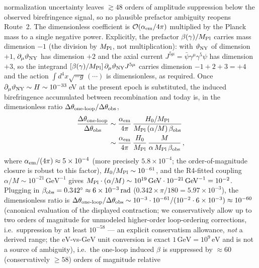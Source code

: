 \documentclass[aps,prd,twocolumn,superscriptaddress,showpacs,preprintnumbers,nofootinbib,longbibliography,floatfix]{revtex4-2}
\begin{document}
normalization uncertainty leaves $\gtrsim\!48$ orders of amplitude suppression
below the observed birefringence signal, so no plausible prefactor ambiguity
reopens Route~2. The dimensionless coefficient is $\mathcal{O}(\alpha_{\rm em}/4\pi)$
multiplied by the Planck mass to a single negative power. Explicitly, the
prefactor $\beta(\gamma)/M_{\rm Pl}$ carries mass dimension $-1$ (the
division by $M_{\rm Pl}$, not multiplication): with $\vartheta_{\rm NY}$ of
dimension $+1$, $\partial_\mu\vartheta_{\rm NY}$ has dimension $+2$ and the
axial current $J^{5\mu}=\bar\psi\gamma^\mu\gamma^5\psi$ has dimension $+3$,
so the integrand $[\beta(\gamma)/M_{\rm Pl}]\,\partial_\mu\vartheta_{\rm NY}J^{5\mu}$
carries dimension $-1+2+3=+4$ and the action $\int d^4x\sqrt{-g}\,(\cdots)$
is dimensionless, as required. Once
$\partial_\mu\vartheta_{\rm NY} \sim H \sim 10^{-33}\,$eV at the present epoch is
substituted, the induced birefringence accumulated between
recombination and today is, in the dimensionless ratio
$\Delta\theta_{\rm one\text{-}loop}/\Delta\theta_{\rm obs}$,
\begin{align}
\frac{\Delta\theta_{\rm one\text{-}loop}}{\Delta\theta_{\rm obs}}
&\sim \frac{\alpha_{\rm em}}{4\pi}\,\frac{H_0/M_{\rm Pl}}{M_{\rm Pl}\,(\alpha/M)\,\beta_{\rm obs}}\nonumber\\
&\sim \frac{\alpha_{\rm em}}{4\pi}\,\frac{H_0}{M_{\rm Pl}}\,\frac{M}{\alpha\,M_{\rm Pl}\,\beta_{\rm obs}}\,,
\end{align}
where $\alpha_{\rm em}/(4\pi) \approx 5 \times 10^{-4}$ (more precisely $5.8\times 10^{-4}$; the order-of-magnitude closure is robust to this factor), $H_0/M_{\rm Pl} \sim
10^{-61}$, and the R4-fitted coupling $\alpha/M \sim 10^{-21}\,\text{GeV}^{-1}$
gives $M_{\rm Pl}\cdot(\alpha/M) \sim 10^{19}\,\text{GeV} \cdot
10^{-21}\,\text{GeV}^{-1} = 10^{-2}$. Plugging in $\beta_{\rm obs}
= 0.342^\circ \approx 6\times 10^{-3}\,\text{rad}$
($0.342\times\pi/180 = 5.97\times 10^{-3}$), the dimensionless ratio is
$\Delta\theta_{\rm one\text{-}loop}/\Delta\theta_{\rm obs} \sim
10^{-3} \cdot 10^{-61}/(10^{-2}\cdot 6\times 10^{-3})\approx 10^{-60}$
(canonical evaluation of the displayed contraction; we conservatively
allow up to two orders of magnitude for unmodeled higher-order
loop-ordering corrections, i.e.\ suppression by at least $10^{-58}$ ---
an explicit conservatism allowance, \emph{not} a derived range; the
$\mathrm{eV}$-vs-$\mathrm{GeV}$ unit conversion is exact
$1\,\mathrm{GeV} = 10^9\,\mathrm{eV}$ and is not a source of
ambiguity), i.e.\ the one-loop induced $\beta$ is suppressed by
${\approx}60$ (conservatively $\geq 58$) orders of magnitude relative
\end{document}
